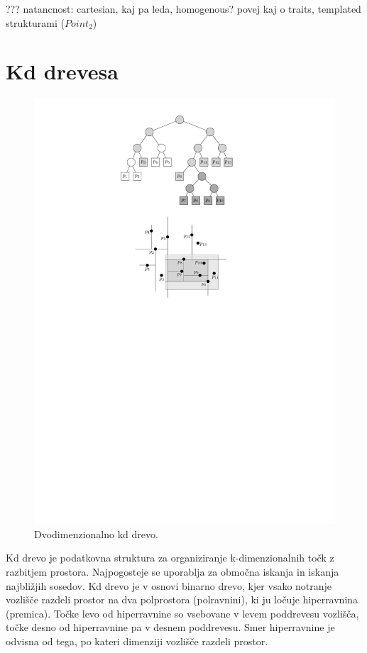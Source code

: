 \documentclass[a4paper, 12pt]{book}
\begin{document}
??? 
natancnost: cartesian, kaj pa leda, homogenous?
povej kaj o traits, templated strukturami ($Point_2$) 

\section{Kd drevesa}

\begin{figure}		
\centerline{\includegraphics[scale=1.2]{pics/kdTree4.pdf}}		
\caption{Dvodimenzionalno kd drevo.}		
\label{kd-primer}		
\end{figure}
Kd drevo je podatkovna struktura za organiziranje k-dimenzionalnih točk z razbitjem prostora. Najpogosteje se uporablja za območna iskanja in iskanja najbližjih sosedov.
Kd drevo je v osnovi binarno drevo, kjer vsako notranje vozlišče razdeli prostor na dva polprostora (polravnini), ki ju ločuje hiperravnina (premica). Točke levo od hiperravnine so vsebovane v levem poddrevesu vozlišča, točke desno od hiperravnine pa v desnem poddrevesu. Smer hiperravnine je odvisna od tega, po kateri dimenziji vozlišče razdeli prostor.
\end{document}
